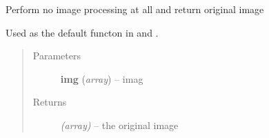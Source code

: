 \documentclass[letterpaper,10pt,english]{sphinxmanual}
\begin{document}

\begin{fulllineitems}
\label{api/ClearMap.ImageProcessing:ClearMap.ImageProcessing.StackProcessing.noProcessing}
Perform no image processing at all and return original image

Used as the default functon in {\hyperref[api/ClearMap.ImageProcessing:ClearMap.ImageProcessing.StackProcessing.parallelProcessStack]{\emph{}}} and
{\hyperref[api/ClearMap.ImageProcessing:ClearMap.ImageProcessing.StackProcessing.sequentiallyProcessStack]{\emph{}}}.
\begin{quote}\begin{description}
\item[{Parameters}] \leavevmode
\textbf{img} (\emph{array}) --
imag

\item[{Returns}] \leavevmode
\emph{(array)} --
the original image

\end{description}\end{quote}

\end{fulllineitems}

\end{document}
